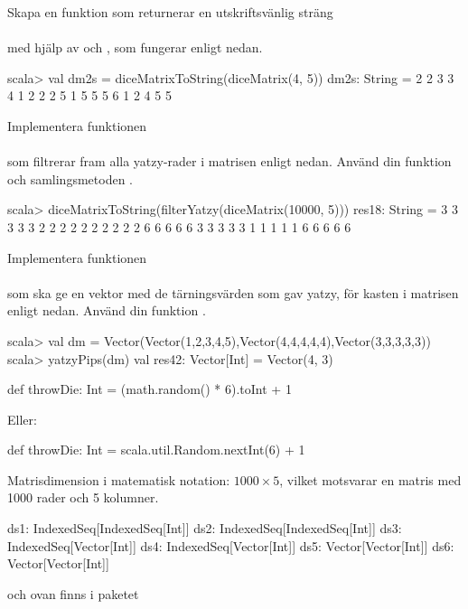 \Subtask \label{matrices:subtask:diceMatrixToString} Skapa en funktion som returnerar en utskriftsvänlig sträng \\  \\med hjälp av  och , som fungerar enligt nedan.
\begin{REPL}
scala> val dm2s = diceMatrixToString(diceMatrix(4, 5))
dm2s: String =
2 2 3 3 4
1 2 2 2 5
1 5 5 5 6
1 2 4 5 5
\end{REPL}



\Subtask Implementera funktionen \\  \\ som filtrerar fram alla yatzy-rader i matrisen  enligt nedan. Använd din funktion  och samlingsmetoden .
\begin{REPL}
scala> diceMatrixToString(filterYatzy(diceMatrix(10000, 5)))
res18: String =
3 3 3 3 3
2 2 2 2 2
2 2 2 2 2
6 6 6 6 6
3 3 3 3 3
1 1 1 1 1
6 6 6 6 6
\end{REPL}



\Subtask Implementera funktionen \\
\\
som ska ge en vektor med de tärningsvärden som gav yatzy, för kasten i matrisen  enligt nedan. Använd din funktion .
\begin{REPL}
scala> val dm = Vector(Vector(1,2,3,4,5),Vector(4,4,4,4,4),Vector(3,3,3,3,3))
scala> yatzyPips(dm)
val res42: Vector[Int] = Vector(4, 3)
\end{REPL}

\SOLUTION

\TaskSolved \what

\SubtaskSolved
\begin{Code}
def throwDie: Int = (math.random() * 6).toInt + 1
\end{Code}
Eller:
\begin{Code}
def throwDie: Int = scala.util.Random.nextInt(6) + 1
\end{Code}

\SubtaskSolved  Matrisdimension i matematisk notation: $1000 \times 5$, vilket motsvarar en matris med 1000 rader och 5 kolumner.

\SubtaskSolved
\begin{Code}
ds1: IndexedSeq[IndexedSeq[Int]]
ds2: IndexedSeq[IndexedSeq[Int]]
ds3: IndexedSeq[Vector[Int]]
ds4: IndexedSeq[Vector[Int]]
ds5: Vector[Vector[Int]]
ds6: Vector[Vector[Int]]
\end{Code}
 och  ovan finns i paketet 

